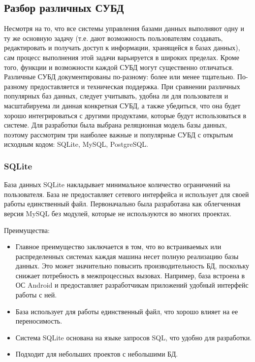 \documentclass[a4paper,14pt]{extarticle}
\begin{document}
 	\subsection{Разбор различных СУБД}
 	
 	Несмотря на то, что все системы управления базами данных выполняют одну и ту же основную задачу (т.е. дают возможность пользователям создавать, редактировать и получать доступ к информации, хранящейся в базах данных), сам процесс выполнения этой задачи варьируется в широких пределах. Кроме того, функции и возможности каждой СУБД могут существенно отличаться. Различные СУБД документированы по-разному: более или менее тщательно. По-разному предоставляется и техническая поддержка. При сравнении различных популярных баз данных, следует учитывать, удобна ли для пользователя и масштабируема ли данная конкретная СУБД, а также убедиться, что она будет хорошо интегрироваться с другими продуктами, которые будут использоваться в системе. Для разработки была выбрана реляционная модель базы данных, поэтому рассмотрим три наиболее важные и популярные СУБД с открытым исходным кодом: SQLite\cite{sqlite}, MySQL\cite{mysql}, PostgreSQL\cite{postgresql}\cite{postgresql_better}.
 	
 	\subsubsection{SQLite}
 	
 	База данных SQLite накладывает минимальное количество ограничений на пользователя. База не предоставляет сетевого интерфейса и использует для своей работы единственный файл. Первоначально была разработана как облегченная версия MySQL без модулей, которые не используются во многих проектах. 
 	
 	Преимущества:
 	
 	\begin{itemize}
 		\item Главное преимущество заключается в том, что во встраиваемых или распределенных системах каждая машина несет полную реализацию базы данных. Это может значительно повысить производительность БД, поскольку снижает потребность в межпроцессных вызовах. Например, база встроена в ОС Android и предоставляет разработчикам приложений удобный интерфейс работы с ней.
 		\item База использует для работы единственный файл, что хорошо влияет на ее переносимость.
 		\item Система SQLite основана на языке запросов SQL, что удобно для разработки.
 		\item Подходит для небольших проектов с небольшими БД. 
 	\end{itemize}
 
\end{document}
